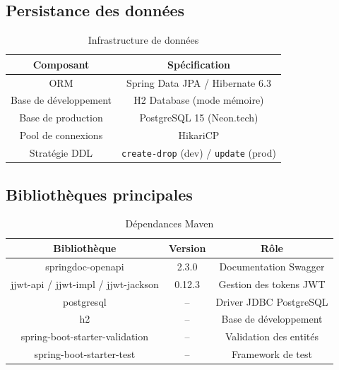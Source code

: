 \documentclass[12pt,a4paper]{article}
\newcommand{\tableheader}[1]{\textbf{#1}}
\begin{document}
\subsection{Persistance des données}

\begin{table}[H]
    \centering
    \renewcommand{\arraystretch}{1.3}
    \begin{tabular}{|c|c|}
        \hline
        \tableheader{Composant} & \tableheader{Spécification} \\
        \hline
        ORM & Spring Data JPA / Hibernate 6.3 \\
        \hline
        Base de développement & H2 Database (mode mémoire) \\
        \hline
        Base de production & PostgreSQL 15 (Neon.tech) \\
        \hline
        Pool de connexions & HikariCP \\
        \hline
        Stratégie DDL & \texttt{create-drop} (dev) / \texttt{update} (prod) \\
        \hline
    \end{tabular}
    \caption{Infrastructure de données}
\end{table}

\subsection{Bibliothèques principales}

\begin{table}[H]
    \centering
    \renewcommand{\arraystretch}{1.3}
    \begin{tabular}{|c|c|c|}
        \hline
        \tableheader{Bibliothèque} & \tableheader{Version} & \tableheader{Rôle} \\
        \hline
        springdoc-openapi & 2.3.0 & Documentation Swagger \\
        \hline
        jjwt-api / jjwt-impl / jjwt-jackson & 0.12.3 & Gestion des tokens JWT \\
        \hline
        postgresql & -- & Driver JDBC PostgreSQL \\
        \hline
        h2 & -- & Base de développement \\
        \hline
        spring-boot-starter-validation & -- & Validation des entités \\
        \hline
        spring-boot-starter-test & -- & Framework de test \\
        \hline
    \end{tabular}
    \caption{Dépendances Maven}
\end{table}
\end{document}
